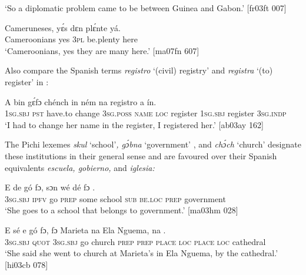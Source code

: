 \glt ‘So a diplomatic problem came to be between Guinea and Gabon.’ [fr03ft 007]
\z


\ea%
    \label{ex:key:1755}
    \gll Cameruneses,    yɛ́s  dɛn  plɛ́nte    yá.\\
Cameroonians  yes  \textsc{3pl}  be.plenty  here\\

\glt ‘Cameroonians, yes they are many here.’ [ma07fn 607]
\z

Also compare the Spanish terms \textit{registro} ‘(civil) registry’ and \textit{registra} ‘(to) register’ in :


\ea%
    \label{ex:key:1756}
    \gll A    bin  gɛ́fɔ    chénch  in    ném    na  registro  
a      ín.\\
\textsc{1sg.sbj}  \textsc{pst}  have.to  change  \textsc{3sg.poss}  \textsc{name}  \textsc{loc}  register  
\textsc{1sg.sbj}  register  \textsc{3sg.indp}\\

\glt ‘I had to change her name in the register, I registered her.’ [ab03ay 162]
\z

The Pichi lexemes \textit{skul} ‘school’\textit{, gɔ́bna} ‘government’ , and \textit{chɔ́ch} ‘church’  designate these institutions in their general sense and are favoured over their Spanish equivalents \textit{escuela, gobierno}\textit{,}\textit{} and\textit{ iglesia:}


\ea%
    \label{ex:key:1757}
    \gll E    de  gó  fɔ,  sɔn        wé  dé    fɔ  .\\
\textsc{3sg.sbj}  \textsc{ipfv}  go  \textsc{prep}  some  school  \textsc{sub}  \textsc{be.loc}  \textsc{prep}  government\\

\glt ‘She goes to a school that belongs to government.’ [ma03hm 028]
\z


\ea%
    \label{ex:key:1758}
    \gll E    sé  e    gó    fɔ,  fɔ  Marieta  na  {Ela Nguema},
na  .\\
\textsc{3sg.sbj}  \textsc{quot}  \textsc{3sg.sbj}  go  church  \textsc{prep}  \textsc{prep}  \textsc{place}  \textsc{loc}  \textsc{place}
\textsc{loc}  cathedral\\

\glt ‘She said she went to church at Marieta’s in Ela Nguema, by the cathedral.’ [hi03cb 078]
\z

